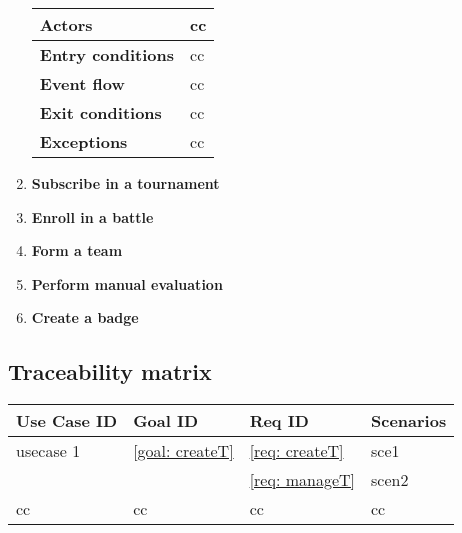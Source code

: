 \begin{enumerate}[series=usecases, label=\textbf{UC.\arabic*}]
\begin{table}[H]
\begin{tabular}{|m{3.2cm}|m{9.8cm}|}
                    \hline
                    \textbf{Actors} & cc \\
                    \hline
                    \textbf{Entry conditions}  & cc \\
                    \hline
                    \textbf{Event flow}  & cc \\ 
                    \hline
                    \textbf{Exit conditions}  & cc \\
                    \hline
                    \textbf{Exceptions}  & cc \\
                    \hline 
                \end{tabular}
        \end{table}
        \item {} \textbf{Subscribe in a tournament}
        \item {} \textbf{Enroll in a battle}
        \item {} \textbf{Form a team}
        \item {} \textbf{Perform manual evaluation}
        \item {} \textbf{Create a badge}
    \end{enumerate}
    

    \subsection{Traceability matrix}
    \begin{table}[h]
	    \centering
            \renewcommand{\arraystretch}{1.5}
            \begin{tabular}{|m{3cm}|m{3cm}|m{3cm}|m{3cm}|}
                \hline
                \textbf{Use Case ID} & \textbf{Goal ID} & \textbf{Req ID} & \textbf{Scenarios} \\
                \hline
                usecase 1 & \ref{goal: createT} & \ref{req: createT} & sce1  \\
                \null & \null  & \ref{req: manageT} & scen2 \\
                \hline
                cc & cc & cc & cc  \\
                \hline 
            \end{tabular}
    \end{table}
    
\clearpage
